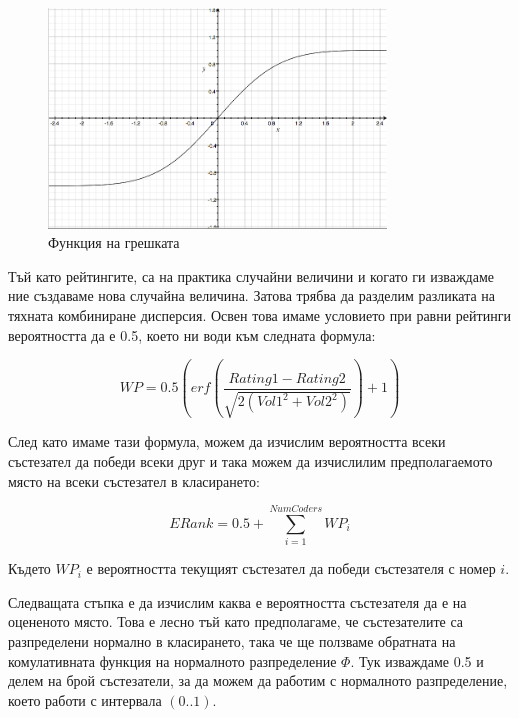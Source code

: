 \documentclass[a4paper,12pt]{article}
\begin{document}
  \begin{figure}
    \begin{center}
      \includegraphics[width=0.8\textwidth]{error_function.png}
    \end{center}
    \caption{Функция на грешката}
    \label{error_function}
  \end{figure}
  
  Тъй като рейтингите, са на практика случайни величини и когато ги изваждаме ние създаваме нова случайна величина. Затова трябва да разделим разликата на тяхната комбиниране дисперсия. Освен това имаме условието при равни рейтинги вероятността да е 0.5, което ни води към следната формула:
  
  \begin{equation}
    WP=0.5\left(erf\left(\frac{Rating1 - Rating2}{\sqrt{2(Vol1^2+Vol2^2)}}\right) + 1\right)
  \end{equation}
  
  След като имаме тази формула, можем да изчислим вероятността всеки състезател да победи всеки друг и така можем да изчислилим предполагаемото място на всеки състезател в класирането:
  
  \begin{equation}
    ERank=0.5+\sum\limits_{i=1}^{NumCoders} WP_i
  \end{equation}
  
  Където \(WP_i\) е вероятността текущият състезател да победи състезателя с номер \(i\).
  
  Следващата стъпка е да изчислим каква е вероятността състезателя да е на оцененото място. Това е лесно тъй като предполагаме, че състезателите са разпределени нормално в класирането, така че ще ползваме обратната на комулативната функция на нормалното разпределение \(\Phi\). Тук изваждаме 0.5 и делем на брой състезатели, за да можем да работим с нормалното разпределение, което работи с интервала \((0..1)\).
  
\end{document}
